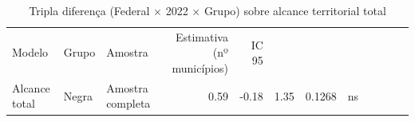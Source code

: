 \begin{table}[!h]
\centering
\caption{Tripla diferença (Federal × 2022 × Grupo) sobre alcance territorial total}
\centering
\begin{tabular}[t]{lllrrrrl}
\toprule
Modelo & Grupo & Amostra & Estimativa (nº municípios) & IC 95%
\midrule
{} &  &  &  &  &  &  & \\
Alcance total & Negra & Amostra completa & 0.59 & -0.18 & 1.35 & 0.1268 & ns\\
\bottomrule
\end{tabular}
\end{table}
